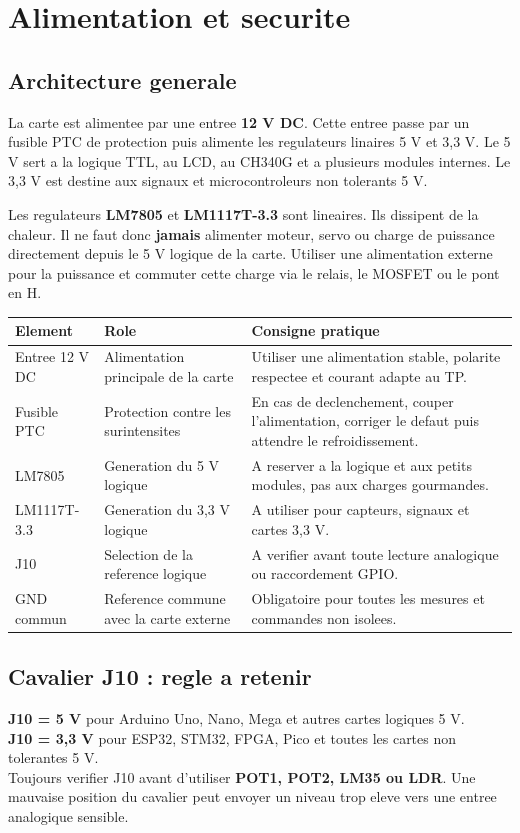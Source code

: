 \documentclass[11pt,a4paper]{article}
\begin{document}
\section{Alimentation et securite}
\subsection{Architecture generale}
La carte est alimentee par une entree \textbf{12 V DC}. Cette entree passe par un fusible PTC de protection puis alimente les regulateurs linaires 5 V et 3,3 V. Le 5 V sert a la logique TTL, au LCD, au CH340G et a plusieurs modules internes. Le 3,3 V est destine aux signaux et microcontroleurs non tolerants 5 V.

\begin{warningbox}
Les regulateurs \textbf{LM7805} et \textbf{LM1117T-3.3} sont lineaires. Ils dissipent de la chaleur. Il ne faut donc \textbf{jamais} alimenter moteur, servo ou charge de puissance directement depuis le 5 V logique de la carte. Utiliser une alimentation externe pour la puissance et commuter cette charge via le relais, le MOSFET ou le pont en H.
\end{warningbox}

{\small
\begin{tabularx}{\textwidth}{@{}L{4.0cm}YY@{}}
\toprule
{}
\textbf{Element} & \textbf{Role} & \textbf{Consigne pratique} \\
\midrule
Entree 12 V DC & Alimentation principale de la carte & Utiliser une alimentation stable, polarite respectee et courant adapte au TP. \\
Fusible PTC & Protection contre les surintensites & En cas de declenchement, couper l'alimentation, corriger le defaut puis attendre le refroidissement. \\
LM7805 & Generation du 5 V logique & A reserver a la logique et aux petits modules, pas aux charges gourmandes. \\
LM1117T-3.3 & Generation du 3,3 V logique & A utiliser pour capteurs, signaux et cartes 3,3 V. \\
J10 & Selection de la reference logique & A verifier avant toute lecture analogique ou raccordement GPIO. \\
GND commun & Reference commune avec la carte externe & Obligatoire pour toutes les mesures et commandes non isolees. \\
\bottomrule
\end{tabularx}}

\subsection{Cavalier J10 : regle a retenir}
\begin{importantbox}
\textbf{J10 = 5 V} pour Arduino Uno, Nano, Mega et autres cartes logiques 5 V. \\
\textbf{J10 = 3,3 V} pour ESP32, STM32, FPGA, Pico et toutes les cartes non tolerantes 5 V. \\
Toujours verifier J10 avant d'utiliser \textbf{POT1, POT2, LM35 ou LDR}. Une mauvaise position du cavalier peut envoyer un niveau trop eleve vers une entree analogique sensible.
\end{importantbox}
\end{document}
